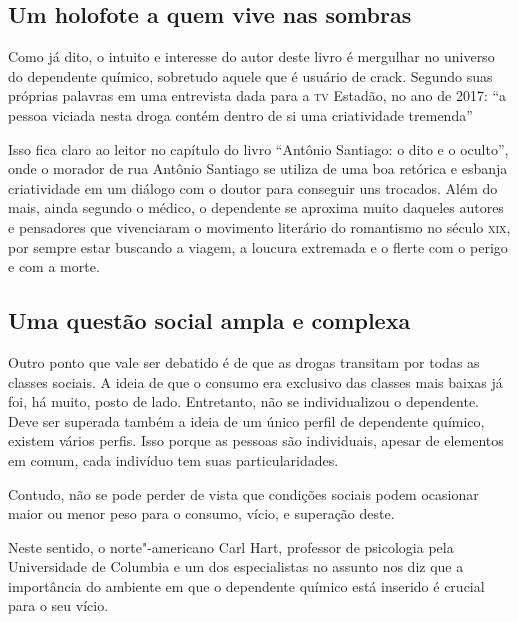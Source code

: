 \documentclass[12pt]{extarticle}
\begin{document}
\subsection{Um holofote a quem vive nas sombras}

Como já dito, o intuito e interesse do autor deste livro é mergulhar no
universo do dependente químico, sobretudo aquele que é usuário de crack.
Segundo suas próprias palavras em uma entrevista dada para a \textsc{tv} Estadão,
no ano de 2017: ``a pessoa viciada nesta droga contém dentro de si uma
criatividade tremenda''


Isso fica claro ao leitor no capítulo do livro ``Antônio Santiago: o
dito e o oculto'', onde o morador de rua Antônio Santiago se utiliza de
uma boa retórica e esbanja criatividade em um diálogo com o doutor para
conseguir uns trocados. Além do mais, ainda segundo o médico, o
dependente se aproxima muito daqueles autores e pensadores que
vivenciaram o movimento literário do romantismo no século \textsc{xix}, por
sempre estar buscando a viagem, a loucura extremada e o flerte com o
perigo e com a morte.

\subsection{Uma questão social ampla e complexa}

Outro ponto que vale ser debatido é de que as drogas transitam por todas
as classes sociais. A ideia de que o consumo era exclusivo das classes
mais baixas já foi, há muito, posto de lado. Entretanto, não se
individualizou o dependente. Deve ser superada também a ideia de um
único perfil de dependente químico, existem vários perfis. Isso porque
as pessoas são individuais, apesar de elementos em comum, cada indivíduo
tem suas particularidades.


Contudo, não se pode perder de vista que condições sociais podem
ocasionar maior ou menor peso para o consumo, vício, e superação deste.

Neste sentido, o norte"-americano Carl Hart, professor de psicologia pela
Universidade de Columbia e um dos especialistas no assunto nos diz que a
importância do ambiente em que o dependente químico está inserido é
crucial para o seu vício.
\end{document}
